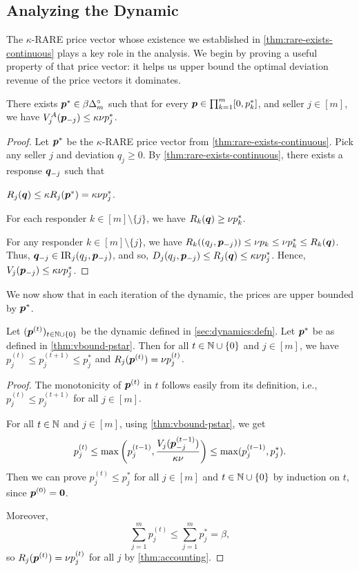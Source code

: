 \subsection{Analyzing the Dynamic}

The $\kappa$-RARE price vector whose existence we established in
\cref{thm:rare-exists-continuous} plays a key role in the analysis.
We begin by proving a useful property of that price vector:
it helps us upper bound the optimal deviation revenue of the price vectors it dominates.

\begin{lemma}
\label{thm:vbound-pstar}
There exists $\bm{p}^* \in \beta\Delta_m^{\circ}$ such that for every $\bm{p} \in \prod_{k=1}^m [0, p^*_k]$,
and seller $j \in [m]$, we have $V^A_j(\bm{p}_{-j}) \le \kappa\nu p^*_j$.
\end{lemma}
\begin{proof}
Let $\bm{p}^*$ be the $\kappa$-RARE price vector from \cref{thm:rare-exists-continuous}.
Pick any seller $j$ and deviation $q_j \ge 0$.
By \cref{thm:rare-exists-continuous}, there exists a response $\bm{q}_{-j}$ such that
\begin{tightenum}
\item $R_j(\bm{q}) \le \kappa R_j(\bm{p}^*) = \kappa\nu p^*_j$.
\item For each responder $k \in [m] \setminus \{j\}$, we have $R_k(\bm{q}) \ge \nu p_k^*$.
\end{tightenum}

For any responder $k \in [m] \setminus \{j\}$, we have
$R_k((q_j, \bm{p}_{-j})) \le \nu p_k \le \nu p_k^* \le R_k(\bm{q})$.
Thus, $\bm{q}_{-j} \in \operatorname{IR}_j(q_j, \bm{p}_{-j})$, and so,
$D_j(q_j, \bm{p}_{-j}) \le R_j(\bm{q}) \le \kappa \nu p^*_j$.
Hence, $V_j(\bm{p}_{-j}) \le \kappa \nu p^*_j$.
\end{proof}

We now show that in each iteration of the dynamic, the prices are upper bounded by $\bm{p}^*$.

\begin{lemma}
Let $(\bm{p}^{(t)})_{t \in \mathbb{N} \cup \{0\}}$ be the dynamic defined in \cref{sec:dynamics:defn}.
Let $\bm{p}^*$ be as defined in \cref{thm:vbound-pstar}.
Then for all $t \in \mathbb{N} \cup \{0\}$ and $j \in [m]$, we have
$p^{(t)}_j \le p^{(t+1)}_j \le p^*_j$ and $R_j(\bm{p}^{(t)}) = \nu p^{(t)}_j$.
\end{lemma}
\begin{proof}
The monotonicity of $\bm{p}^{(t)}$ in $t$ follows easily from its definition,
i.e., $p^{(t)}_j \le p^{(t+1)}_j$ for all $j \in [m]$.

For all $t \in \mathbb{N}$ and $j \in [m]$, using \cref{thm:vbound-pstar}, we get
\[ p^{(t)}_j \le \max\bigg(p^{(t-1)}_j, \frac{V_j(\bm{p}^{(t-1)}_{-j})}{\kappa\nu}\bigg)
    \le \max(p^{(t-1)}_j, p^*_j). \]
Then we can prove $p^{(t)}_j \le p^*_j$ for all $j \in [m]$ and $t \in \mathbb{N} \cup \{0\}$ by induction on $t$,
since $\bm{p}^{(0)} = \mathbf{0}$.

Moreover,
\[ \sum_{j=1}^m p^{(t)}_j \le \sum_{j=1}^m p^*_j = \beta, \]
so $R_j(\bm{p}^{(t)}) = \nu p^{(t)}_j$ for all $j$ by \cref{thm:accounting}.
\end{proof}

